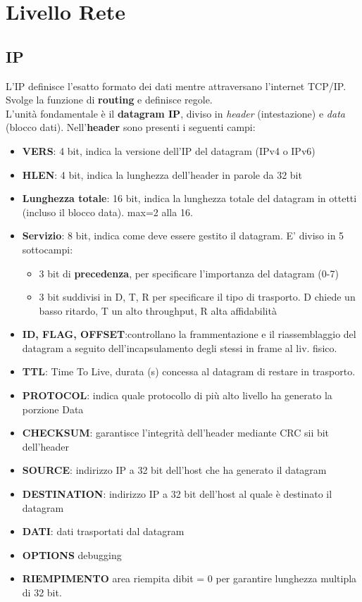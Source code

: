 \documentclass[a4paper,11pt]{article}
\begin{document}
\section{Livello Rete}
\subsection{IP}
L'IP definisce l'esatto formato dei dati mentre attraversano l'internet TCP/IP. Svolge la funzione di \textbf{routing} e definisce regole.\\
 L'unità fondamentale è il \textbf{datagram IP}, diviso in \textit{header} (intestazione) e \textit{data} (blocco dati).
 Nell'\textbf{header} sono presenti i seguenti campi:
 \begin{itemize}
 \item\textbf{VERS}: 4 bit, indica la versione dell'IP del datagram (IPv4 o IPv6)
 \item\textbf{HLEN}: 4 bit, indica la lunghezza dell'header in parole da 32 bit
 \item\textbf{Lunghezza totale}: 16 bit, indica la lunghezza totale del datagram in ottetti (incluso il blocco data). max=2 alla 16.
 \item\textbf{Servizio}: 8 bit, indica come deve essere gestito il datagram. E' diviso in 5 sottocampi:
 \begin{itemize}
 \item 3 bit di \textbf{precedenza}, per specificare l'importanza del datagram (0-7)
 \item3 bit suddivisi in D, T, R per specificare il tipo di trasporto. D chiede un basso ritardo, T un alto throughput, R alta affidabilità
 \end{itemize}
 \item\textbf{ID, FLAG, OFFSET}:controllano la frammentazione e il riassemblaggio del datagram a seguito dell'incapsulamento degli stessi in frame al liv. fisico.
 \item\textbf{TTL}: Time To Live, durata (s) concessa al datagram di restare in trasporto.
 \item\textbf{PROTOCOL}: indica quale protocollo di più alto livello ha generato la porzione Data
 \item\textbf{CHECKSUM}: garantisce l'integrità dell'header mediante CRC sii bit dell'header
 \item\textbf{SOURCE}: indirizzo IP a 32 bit dell'host che ha generato il datagram
 \item\textbf{DESTINATION}: indirizzo IP a 32 bit dell'host al quale è destinato il datagram
 \item\textbf{DATI}: dati trasportati dal datagram
 \item\textbf{OPTIONS} debugging
 \item\textbf{RIEMPIMENTO} area riempita dibit = 0 per garantire lunghezza multipla di 32 bit.
 \end{itemize}\newpage
\end{document}

